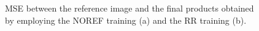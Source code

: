 \documentclass[12pt]{report}
\begin{document}
\begin{figure}
    \hfill
    \caption{MSE between the reference image and the final products obtained by employing the NOREF training (a) and the RR training (b).}
    \label{fig:diffcolors}
\end{figure}
\end{document}
